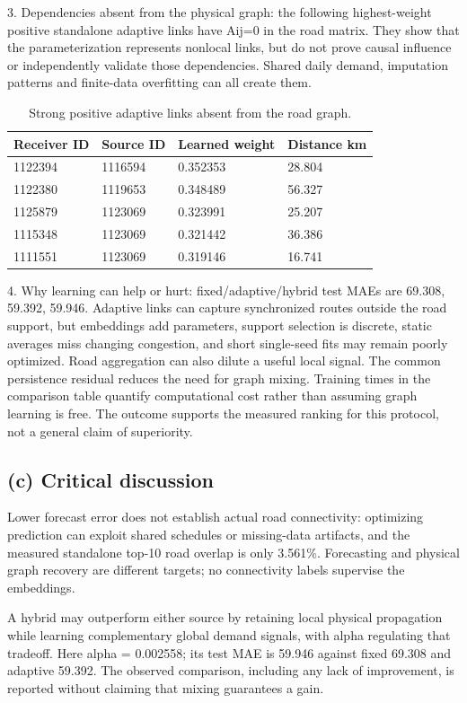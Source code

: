 \documentclass[11pt,a4paper]{article}
\begin{document}
3. Dependencies absent from the physical graph: the following highest-weight positive standalone adaptive links have Aij=0 in the road matrix. They show that the parameterization represents nonlocal links, but do not prove causal influence or independently validate those dependencies. Shared daily demand, imputation patterns and finite-data overfitting can all create them.

\begin{table}[htbp]\centering\small\caption{Strong positive adaptive links absent from the road graph.}\begin{tabular}{llll}\toprule
Receiver ID & Source ID & Learned weight & Distance km\\\midrule
1122394 & 1116594 & 0.352353 & 28.804\\
1122380 & 1119653 & 0.348489 & 56.327\\
1125879 & 1123069 & 0.323991 & 25.207\\
1115348 & 1123069 & 0.321442 & 36.386\\
1111551 & 1123069 & 0.319146 & 16.741\\
\bottomrule\end{tabular}\end{table}
4. Why learning can help or hurt: fixed/adaptive/hybrid test MAEs are 69.308, 59.392, 59.946. Adaptive links can capture synchronized routes outside the road support, but embeddings add parameters, support selection is discrete, static averages miss changing congestion, and short single-seed fits may remain poorly optimized. Road aggregation can also dilute a useful local signal. The common persistence residual reduces the need for graph mixing. Training times in the comparison table quantify computational cost rather than assuming graph learning is free. The outcome supports the measured ranking for this protocol, not a general claim of superiority.

\subsection{(c) Critical discussion}
Lower forecast error does not establish actual road connectivity: optimizing prediction can exploit shared schedules or missing-data artifacts, and the measured standalone top-10 road overlap is only 3.561\%. Forecasting and physical graph recovery are different targets; no connectivity labels supervise the embeddings.

A hybrid may outperform either source by retaining local physical propagation while learning complementary global demand signals, with alpha regulating that tradeoff. Here alpha = 0.002558; its test MAE is 59.946 against fixed 69.308 and adaptive 59.392. The observed comparison, including any lack of improvement, is reported without claiming that mixing guarantees a gain.
\end{document}
